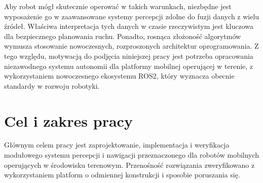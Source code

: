 \documentclass[a4paper,twoside,12pt]{book}
\begin{document}

Aby robot mógł skutecznie operować w takich warunkach, niezbędne jest wyposażenie go w zaawansowane systemy percepcji zdolne do fuzji danych z wielu źródeł. Właściwa interpretacja tych danych w czasie rzeczywistym jest kluczowa dla bezpiecznego planowania ruchu. Ponadto, rosnąca złożoność algorytmów wymusza stosowanie nowoczesnych, rozproszonych architektur oprogramowania. Z tego względu, motywacją do podjęcia niniejszej pracy jest potrzeba opracowania niezawodnego systemu autonomii dla platformy mobilnej operującej w terenie, z wykorzystaniem nowoczesnego ekosystemu ROS2, który wyznacza obecnie standardy w rozwoju robotyki.

\section{Cel i zakres pracy}

Głównym celem pracy jest zaprojektowanie, implementacja i weryfikacja modułowego systemu percepcji i nawigacji przeznaczonego dla robotów mobilnych operujących w środowisku terenowym. Przenośność rozwiązania zweryfikowano z wykorzystaniem platform o odmiennej konstrukcji i sposobie poruszania się.
\end{document}

